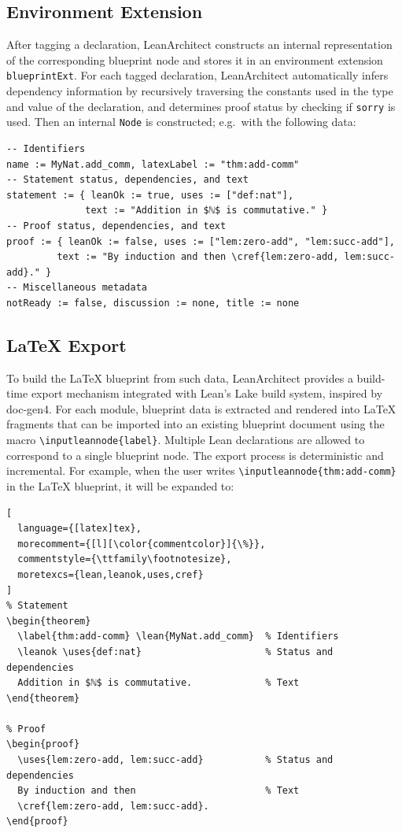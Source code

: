 \documentclass{article}
\newcommand{\leanarchitect}{LeanArchitect\xspace}
\newcommand\bplatexcode{\lstinline[language={[latex]tex},keywordstyle=\ttfamily\color{keywordcolor},moretexcs={inputleannode,inputleanmodule}]}
\newcommand\leancode{\lstinline[language=lean]}
\begin{document}
\subsection{Environment Extension}

After tagging a declaration, \leanarchitect constructs an internal representation of the corresponding blueprint node and stores it in an environment extension \leancode{blueprintExt}. For each tagged declaration, \leanarchitect automatically infers dependency information by recursively traversing the constants used in the type and value of the declaration, and determines proof status by checking if \leancode{sorry} is used. Then an internal \leancode{Node} is constructed; e.g.~with the following data:

\begin{lstlisting}
-- Identifiers
name := MyNat.add_comm, latexLabel := "thm:add-comm"
-- Statement status, dependencies, and text
statement := { leanOk := true, uses := ["def:nat"],
              text := "Addition in $ℕ$ is commutative." }
-- Proof status, dependencies, and text
proof := { leanOk := false, uses := ["lem:zero-add", "lem:succ-add"],
         text := "By induction and then \cref{lem:zero-add, lem:succ-add}." }
-- Miscellaneous metadata
notReady := false, discussion := none, title := none
\end{lstlisting}

\subsection{\LaTeX{} Export} \label{sec:latex-export}

To build the \LaTeX{} blueprint from such data, LeanArchitect provides a build-time export mechanism integrated with Lean's Lake build system, inspired by doc-gen4. For each module, blueprint data is extracted and rendered into \LaTeX{} fragments that can be imported into an existing blueprint document using the macro \bplatexcode|\inputleannode{label}|. Multiple Lean declarations are allowed to correspond to a single blueprint node. The export process is deterministic and incremental. For example, when the user writes \bplatexcode|\inputleannode{thm:add-comm}| in the \LaTeX{} blueprint, it will be expanded to:

\begin{lstlisting}[
  language={[latex]tex},
  morecomment={[l][\color{commentcolor}]{\%}},
  commentstyle={\ttfamily\footnotesize},
  moretexcs={lean,leanok,uses,cref}
]
% Statement
\begin{theorem}
  \label{thm:add-comm} \lean{MyNat.add_comm}  % Identifiers
  \leanok \uses{def:nat}                      % Status and dependencies
  Addition in $ℕ$ is commutative.             % Text
\end{theorem}

% Proof
\begin{proof}
  \uses{lem:zero-add, lem:succ-add}           % Status and dependencies
  By induction and then                       % Text
  \cref{lem:zero-add, lem:succ-add}.
\end{proof}
\end{lstlisting}
\end{document}
